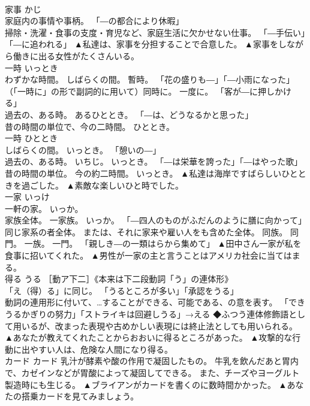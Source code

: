 \documentclass[8pt]{extreport}
\begin{document}
\begin{CJK}{UTF8}{min}
\\	家事	かじ	
\\	家庭内の事情や事柄。 「―の都合により休暇」 
\\	掃除・洗濯・食事の支度・育児など、家庭生活に欠かせない仕事。 「―手伝い」「―に追われる」	▲私達は、家事を分担することで合意した。 ▲家事をしながら働きに出る女性がたくさんいる。
\\	一時	いっとき	
\\	わずかな時間。 しばらくの間。 暫時。 「花の盛りも―」「―小雨になった」 
\\	（「一時に」の形で副詞的に用いて）同時に。 一度に。 「客が―に押しかける」 
\\	過去の、ある時。 あるひととき。 「―は、どうなるかと思った」 
\\	昔の時間の単位で、今の二時間。 ひととき。	
\\	一時	ひととき	
\\	しばらくの間。 いっとき。 「憩いの―」 
\\	過去の、ある時。 いちじ。 いっとき。 「―は栄華を誇った」「―はやった歌」 
\\	昔の時間の単位。 今の約二時間。 いっとき。	▲私達は海岸ですばらしいひとときを過ごした。 ▲素敵な楽しいひと時でした。
\\	一家	いっけ	
\\	一軒の家。 いっか。 
\\	家族全体。 一家族。 いっか。 「―四人のものがふだんのように膳に向かって」 
\\	同じ家系の者全体。 または、それに家来や雇い人をも含めた全体。 同族。 同門。 一族。 一門。 「親しき―の一類はらから集めて」	▲田中さん一家が私を食事に招いてくれた。 ▲男性が一家の主と言うことはアメリカ社会に当てはまる。
\\	得る	うる	［動ア下二］《本来は下二段動詞「う」の連体形》 
\\	「え（得）る」に同じ。 「うるところが多い」「承認をうる」 
\\	動詞の連用形に付いて、…することができる、可能である、の意を表す。 「できうるかぎりの努力」「ストライキは回避しうる」→える ◆ふつう連体修飾語として用いるが、改まった表現や古めかしい表現には終止法としても用いられる。	▲あなたが教えてくれたことからおおいに得るところがあった。 ▲攻撃的な行動に出やすい人は、危険な人間になり得る。
\\	カード	カード	乳汁が酵素や酸の作用で凝固したもの。 牛乳を飲んだあと胃内で、カゼインなどが胃酸によって凝固してできる。 また、チーズやヨーグルト製造時にも生じる。	▲ブライアンがカードを書くのに数時間かかった。 ▲あなたの搭乗カードを見てみましょう。

\end{CJK}
\end{document}
